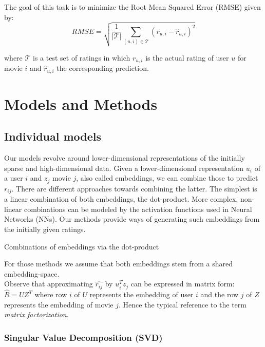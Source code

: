 \documentclass[10pt,conference,compsocconf]{IEEEtran}
\begin{document}
The goal of this task is to minimize the Root Mean Squared Error (RMSE) given by:
\begin{equation}
RMSE = \sqrt{\frac{1}{|\mathcal{T}|}\sum_{(u, i) \in \mathcal{T}} (r_{u,i} -\widehat{r}_{u,i})^2}    
\end{equation}



where $\mathcal{T}$ is a test set of ratings in which $r_{u, i}$ is the actual rating of user $u$ for movie $i$ and $\widehat{r}_{u,i}$ the corresponding prediction. 


\section{Models and Methods}
\label{sec:methods}
\subsection{Individual models}
Our models revolve around lower-dimensional representations of the initially sparse and high-dimensional data. Given a lower-dimensional representation $u_i$ of a user $i$ and $z_j$ movie $j$, also called embeddings, we can combine those to predict $r_{ij}$. There are different approaches towards combining the latter. The simplest is a linear combination of both embeddings, the dot-product. More complex, non-linear combinations can be modeled by the activation functions used in Neural Networks (NNs). Our methods provide ways of generating such embeddings from the initially given ratings.

Combinations of embeddings via the dot-product

For those methods we assume that both embeddings stem from a shared embedding-space. \\
Observe that approximating $\hat{r_{ij}}$ by $u_i^Tz_j$ can be expressed in matrix form: $\hat{R} = UZ^T$ where row $i$ of $U$ represents the embedding of user $i$ and the row $j$ of $Z$ represents the embedding of movie $j$. Hence the typical reference to the term \emph{matrix factorization}.\\

\subsubsection{Singular Value Decomposition (SVD)}
\end{document}
